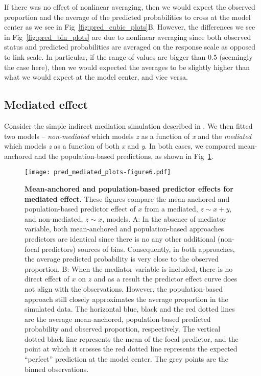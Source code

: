 \documentclass[10pt,letterpaper]{article}
\begin{document}
If there was no effect of nonlinear averaging, then we would expect the observed proportion and the average of the predicted probabilities to cross at the model center as we see in Fig~\ref{fig:pred_cubic_plots}B. However, the differences we see in Fig~\ref{fig:pred_bin_plots} are due to nonlinear averaging since both observed status and predicted probabilities are averaged on the response scale as opposed to link scale. In particular, if the range of values are bigger than $0.5$ (seemingly the case here), then we would expected the averages to be slightly higher than what we would expect at the model center, and vice versa.

\subsection*{Mediated effect}

Consider the simple indirect mediation simulation described in . We then fitted two models -- \emph{non-mediated} which models \emph{z} as a function of \emph{x} and the \emph{mediated} which models \emph{z} as a function of both \emph{x} and \emph{y}. In both cases, we compared mean-anchored and the population-based predictions, as shown in Fig~\ref{fig:pred_mediated_plots}.

\begin{figure}[!h]
\centering
\texttt{[image: pred\_mediated\_plots-figure6.pdf]}
\caption{{\bf Mean-anchored and population-based predictor effects for mediated effect.} These figures compare the mean-anchored and population-based predictor effect of $x$ from a mediated, $z \sim x + y$, and non-mediated, $z \sim x$, models. A: In the absence of mediator variable, both mean-anchored and population-based approaches predictors are identical since there is no any other additional (non-focal predictors) sources of bias. Consequently, in both approaches, the average predicted probability is very close to the observed proportion. B: When the mediator variable is included, there is no direct effect of $x$ on $z$ and as a result the predictor effect curve does not align with the observations. However, the population-based approach still closely approximates the average proportion in the simulated data. The horizontal blue, black and the red dotted lines are the average mean-anchored, population-based predicted probability and observed proportion, respectively. The vertical dotted black line represents the mean of the focal predictor, and the point at which it crosses the red dotted line represents the expected ``perfect'' prediction at the model center. The grey points are the binned observations.}
\label{fig:pred_mediated_plots}
\end{figure}
\end{document}
